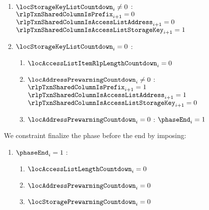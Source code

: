 \begin{enumerate}[resume]
\begin{enumerate}[resume]
\begin{enumerate}
					\item \If $\locStorageKeyListCountdown _{i} \neq 0$ \Then: $\rlpTxnSharedColumnIsPrefix _{i + 1} = 0$ \et $\rlpTxnSharedColumnIsAccessListAddress _{i + 1} = 0$ \et $\rlpTxnSharedColumnIsAccessListStorageKey _{i + 1} = 1$
					\item \If $\locStorageKeyListCountdown _{i} = 0$ \Then:
						\begin{enumerate}
							\item $\locAccessListItemRlpLengthCountdown _{i} = 0$
							\item \If $\locAddressPrewarmingCountdown _{i} \neq 0$ \Then: $\rlpTxnSharedColumnIsPrefix _{i + 1} = 1$ \et $\rlpTxnSharedColumnIsAccessListAddress _{i + 1} = 1$ \et $\rlpTxnSharedColumnIsAccessListStorageKey _{i + 1} = 0$
							\item \If $\locAddressPrewarmingCountdown _{i} = 0$ \Then: $\phaseEnd _{i} =1$
						\end{enumerate}
				\end{enumerate}
		\end{enumerate}

		We constraint finalize the phase before the end by imposing:
		\begin{enumerate}
			\item \If $\phaseEnd _{i} =1$ \Then:
				\begin{enumerate}
					\item $\locAccessListLengthCountdown  _{i} =0$
					\item $\locAddressPrewarmingCountdown _{i} =0$
					\item $\locStoragePrewarmingCountdown _{i} =0$
				\end{enumerate}
		\end{enumerate}


\end{enumerate}
